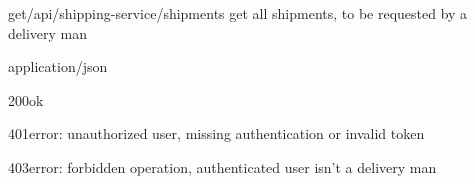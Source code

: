 \begin{apiRoute}{get}{/api/shipping-service/shipments} {get all shipments, to be requested by a delivery man}
	\begin{routeParameter}
	\end{routeParameter}
	\begin{routeResponse}{application/json}
		\begin{routeResponseItem}{200}{ok}
			\begin{routeResponseItemBody}
			\end{routeResponseItemBody}
		\end{routeResponseItem}
	    \begin{routeResponseItem}{401}{error: unauthorized user, missing authentication or invalid token}
    	    \begin{routeResponseItemBody}
			\end{routeResponseItemBody}
		\end{routeResponseItem}
	    \begin{routeResponseItem}{403}{error: forbidden operation, authenticated user isn't a delivery man}
    	    \begin{routeResponseItemBody}
		    \end{routeResponseItemBody}
	    \end{routeResponseItem}	
	\end{routeResponse}
\end{apiRoute}

